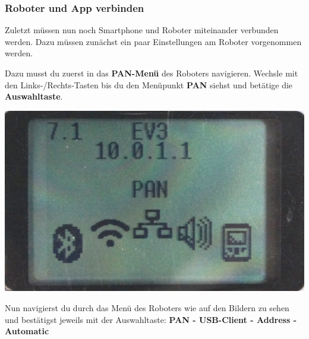 \documentclass[
	12pt,
	article,
	type=bsc, %
	colorbacktitle,
	instlogo,
	accentcolor=tud1c,
	german,
	twoside
]{tudexercise}
\begin{document}
\subsubsection{Roboter und App verbinden}
Zuletzt müssen nun noch Smartphone und Roboter miteinander verbunden werden. Dazu müssen zunächst ein paar Einstellungen am Roboter vorgenommen werden.

\begin{enumerate}

\begin{minipage}{.5\textwidth}
\item Dazu musst du zuerst in das \textbf{PAN-Menü} des Roboters navigieren. Wechsle mit den Links-/Rechts-Tasten bis du den Menüpunkt \textbf{PAN} siehst und betätige die \textbf{Auswahltaste}.
\end{minipage}
\begin{minipage}{.5\textwidth}
\includegraphics[width=.8\textwidth]{img/Pan.png}
\end{minipage}

\item Nun navigierst du durch das Menü des Roboters wie auf den Bildern zu sehen und bestätigst jeweils mit der Auswahltaste: \textbf{PAN - USB-Client - Address - Automatic}


\end{enumerate}
\end{document}
